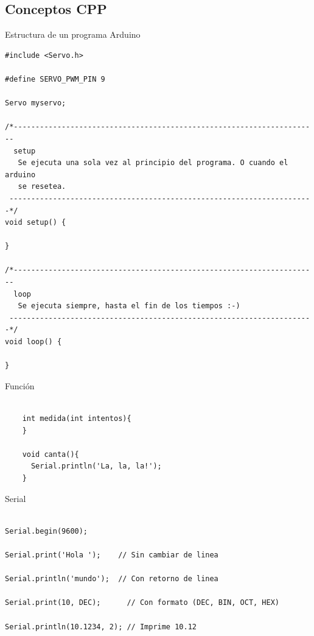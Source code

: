 \subsection{Conceptos CPP}

\begin{frame}[fragile]{Estructura de un programa Arduino}

\begin{lstlisting}
#include <Servo.h>     

#define SERVO_PWM_PIN 9

Servo myservo;         

/*----------------------------------------------------------------------
  setup
   Se ejecuta una sola vez al principio del programa. O cuando el arduino
   se resetea.
 ----------------------------------------------------------------------*/
void setup() {
  
}

/*----------------------------------------------------------------------
  loop
   Se ejecuta siempre, hasta el fin de los tiempos :-)
 ----------------------------------------------------------------------*/
void loop() {

}
\end{lstlisting}

\end{frame}

\begin{frame}[fragile]{Función}
  \begin{lstlisting}

    int medida(int intentos){
    }

    void canta(){
      Serial.println('La, la, la!');
    }

  \end{lstlisting}
\end{frame}

\begin{frame}[fragile]{Serial}
  \begin{lstlisting}

Serial.begin(9600);

Serial.print('Hola ');    // Sin cambiar de linea

Serial.println('mundo');  // Con retorno de linea 

Serial.print(10, DEC);      // Con formato (DEC, BIN, OCT, HEX)

Serial.println(10.1234, 2); // Imprime 10.12

  \end{lstlisting}
\end{frame}

